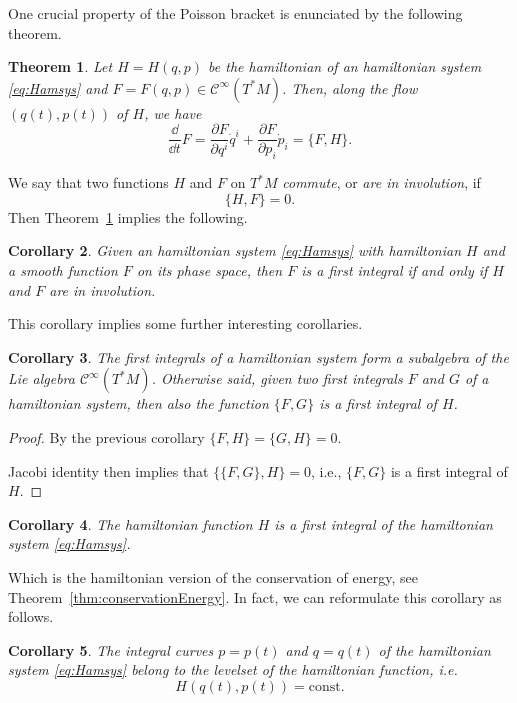 \documentclass[english,fontsize=11pt,paper=b5]{scrbook}
\newtheorem{theorem}{Theorem}[chapter]
\newtheorem{corollary}[theorem]{Corollary}
\theoremstyle{definition}
\begin{document}
    One crucial property of the Poisson bracket is enunciated by the following theorem.

    \begin{theorem}\label{thm:poissondtdF}
      Let $H=H(q,p)$ be the hamiltonian of an hamiltonian system \eqref{eq:Hamsys} and $F=F(q,p)\in\mathcal{C}^\infty(T^*M)$.
      Then, along the flow $(q(t), p(t))$ of $H$, we have
      \begin{equation}
        \frac{\dd}{\dd t} F = \frac{\partial F}{\partial q^i} \dot q^i + \frac{\partial F}{\partial p_i} \dot p_i = \big\{F,H\big\}.
      \end{equation}
    \end{theorem}

    We say that two functions $H$ and $F$ on $T^* M$ \emph{commute}, or \emph{are in involution}, if
    \begin{equation}
      \big\{H,F\big\} = 0.
    \end{equation}
    Then Theorem~\ref{thm:poissondtdF} implies the following.
    \begin{corollary}
      Given an hamiltonian system \eqref{eq:Hamsys} with hamiltonian $H$ and a smooth function $F$ on its phase space, then $F$ is a first integral if and only if $H$ and $F$ are in involution.
    \end{corollary}

    This corollary implies some further interesting corollaries.
    \begin{corollary}
      The first integrals of a hamiltonian system form a subalgebra of the Lie algebra $\mathcal{C}^\infty(T^*M)$.
      Otherwise said, given two first integrals $F$ and $G$ of a hamiltonian system, then also the function $\big\{F,G\big\}$ is a first integral of $H$.
    \end{corollary}
    \begin{proof}
      By the previous corollary $\big\{F,H\big\} = \big\{G,H\big\} = 0$.

      Jacobi identity then implies that $\big\{\big\{F,G\big\},H\big\} = 0$, i.e., $\big\{F,G\big\}$ is a first integral of $H$.
    \end{proof}

    \begin{corollary}
      The hamiltonian function $H$ is a first integral of the hamiltonian system \eqref{eq:Hamsys}.
    \end{corollary}
    Which is the hamiltonian version of the conservation of energy, see Theorem~\ref{thm:conservationEnergy}.
    In fact, we can reformulate this corollary as follows.
    \begin{corollary}
      The integral curves $p = p(t)$ and $q=q(t)$ of the hamiltonian system \eqref{eq:Hamsys} belong to the levelset of the hamiltonian function, i.e.
      \begin{equation}
        H(q(t), p(t)) = \mathrm{const}.
      \end{equation}
    \end{corollary}
\end{document}
